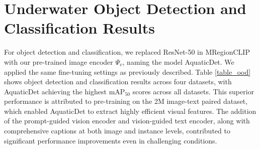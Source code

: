 \section{Underwater Object Detection and Classification Results}
\label{objdetect}
For object detection and classification, we replaced ResNet-50 in MRegionCLIP with our pre-trained image encoder $\Psi_{v}$, naming the model AquaticDet. 
We applied the same fine-tuning settings as previously described. Table \ref{table_ood} shows object detection and classification results across four datasets, with AquaticDet achieving the highest mAP$_{50}$ scores across all datasets. 
This superior performance is attributed to pre-training on the 2M image-text paired dataset, which enabled AquaticDet to extract highly efficient visual features. 
The addition of the prompt-guided vision encoder and vision-guided text encoder, along with comprehensive captions at both image and instance levels, contributed to significant performance improvements even in challenging conditions.





\begin{table}[t!]
\caption{Comparison of supervised object detection and classification results (mAP$_{50}$) across four datasets: FishNet, DeepFish, Brackish, and URPC. 
AquaticDet achieves the highest mAP$_{50}$ scores across all datasets, outperforming other SOTA methods. 
Specifically, AquaticDet scores 0.903 on FishNet, 0.891 on DeepFish, 0.877 on Brackish, and 0.837 on URPC. 
For FishNet, the performance is reported for common family classes.}
\begin{center}
\end{center}
\label{table_ood}
\end{table}

